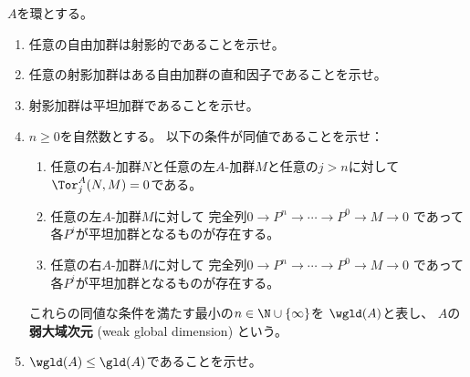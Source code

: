 \documentclass[uplatex,dvipdfmx]{jsarticle}
\begin{document}
\maketitle\HeaderCommentA
\section{}
\fi


\begin{prob}\label{1.29}
  \(A\)を環とする。
  \begin{enumerate}
    \item \label{1.29.1}
    任意の自由加群は射影的であることを示せ。
    \item \label{1.29.2}
    任意の射影加群はある自由加群の直和因子であることを示せ。
    \item \label{1.29.3}
    射影加群は平坦加群であることを示せ。
    \item \label{1.29.4}
    \(n\geq 0\)を自然数とする。
    以下の条件が同値であることを示せ：
    \begin{enumerate}
      \item \label{1.29.4.1}
      任意の右\(A\)-加群\(N\)と任意の左\(A\)-加群\(M\)と任意の\(j>n\)に対して
      \(\Tor_j^A(N,M) = 0\)である。
      \item \label{1.29.4.2}
      任意の左\(A\)-加群\(M\)に対して
      完全列\(0\to P^n \to \cdots \to P^0 \to M\to 0\)
      であって各\(P^i\)が平坦加群となるものが存在する。
      \item \label{1.29.4.3}
      任意の右\(A\)-加群\(M\)に対して
      完全列\(0\to P^n \to \cdots \to P^0 \to M\to 0\)
      であって各\(P^i\)が平坦加群となるものが存在する。
    \end{enumerate}
    これらの同値な条件を満たす最小の\(n\in \N\cup\{\infty\}\)を
    \(\wgld(A)\)と表し、
    \(A\)の\textbf{弱大域次元} (weak global dimension) という。
    \item \label{1.29.5}
    \(\wgld(A) \leq \gld(A)\)であることを示せ。
  \end{enumerate}
\end{prob}
\end{document}
